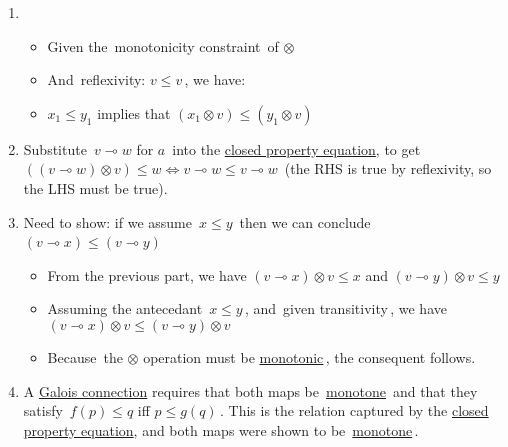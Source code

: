 \begin{enumerate}
    \item
          \begin{itemize}
            \item Given the \,monotonicity constraint\, of $\otimes$
            \item And \,reflexivity: $v \leq v$\,, we have:
            \item $x_1 \leq y_1$ implies that $(x_1 \otimes v) \leq (y_1 \otimes v)$
          \end{itemize}
    \item Substitute \,$v \multimap w$ for $a$\, into the \href{doc/1 math/Seven Sketches in Compositionality/Chapter 2: Resource theories/5 Computing presented V-categories with matrix mult/1 Monoidal closed preorders/1 Closed SMP}{closed property equation}, to get \,$((v \multimap w)\otimes v) \leq w \iff v \multimap w \leq v \multimap w$\, (the RHS is true by reflexivity, so the LHS must be true).
    \item Need to show: if we assume \,$x \leq y$\, then we can conclude \,$(v \multimap x) \leq (v \multimap y)$\,
          \begin{itemize}
            \item From the previous part, we have $(v \multimap x) \otimes v \leq x$ and $(v \multimap y) \otimes v \leq y$
            \item Assuming the antecedant \,$x \leq y$\,, and \,given transitivity\,, we have $(v \multimap x) \otimes v \leq (v \multimap y) \otimes v$
            \item Because \,the $\otimes$ operation must be \href{doc/1 math/Seven Sketches in Compositionality/Chapter 2: Resource theories/2 Symmetric monoidal preorders/1 Definition and first examples/1 Symmetric monoidal structure on a preorder}{monotonic}\,, the consequent follows.
          \end{itemize}
    \item A \href{doc/1 math/Seven Sketches in Compositionality/Chapter 1: Generative Effects/6 Galois connections/1 Definition and examples/Galois connection}{Galois connection} requires that both maps be \,\href{doc/1 math/Seven Sketches in Compositionality/Chapter 1: Generative Effects/4 Monotone maps/1 Monotone map}{monotone}\, and that they satisfy \,$f(p)\leq q$ iff $p \leq g(q)$\,. This is the relation captured by the \href{doc/1 math/Seven Sketches in Compositionality/Chapter 2: Resource theories/5 Computing presented V-categories with matrix mult/1 Monoidal closed preorders/1 Closed SMP}{closed property equation}, and both maps were shown to be \,\href{doc/1 math/Seven Sketches in Compositionality/Chapter 1: Generative Effects/4 Monotone maps/1 Monotone map}{monotone}\,.
  \end{enumerate}

